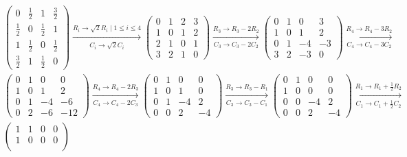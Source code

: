 \begin{align*}
	& \begin{pmatrix}
		0 & \frac{1}{2} & 1 & \frac{3}{2} \\
		\frac{1}{2} & 0 & \frac{1}{2} & 1 \\
		1 & \frac{1}{2} & 0 & \frac{1}{2} \\
		\frac{3}{2} & 1 & \frac{1}{2} & 0
	\end{pmatrix}
	\xrightarrow[C_i \to \sqrt{2} C_i]{R_i \to \sqrt{2} R_i \mid 1 \le i \le 4}
	\begin{pmatrix}
		0 & 1 & 2 & 3 \\
		1 & 0 & 1 & 2 \\
		2 & 1 & 0 & 1 \\
		3 & 2 & 1 & 0
	\end{pmatrix}
	\xrightarrow[C_3 \to C_3 - 2C_2]{R_3 \to R_3 - 2R_2}
	\begin{pmatrix}
		0 & 1 & 0 & 3 \\
		1 & 0 & 1 & 2 \\
		0 & 1 & -4 & -3 \\
		3 & 2 & -3 & 0
	\end{pmatrix}
	\xrightarrow[C_4 \to C_4 - 3C_2]{R_4 \to R_4 - 3R_2} \\
	& \begin{pmatrix}
		0 & 1 & 0 & 0 \\
		1 & 0 & 1 & 2 \\
		0 & 1 & -4 & -6 \\
		0 & 2 & -6 & -12
	\end{pmatrix}
	\xrightarrow[C_4 \to C_4 - 2C_3]{R_4 \to R_4 - 2R_3}
	\begin{pmatrix}
		0 & 1 & 0 & 0 \\
		1 & 0 & 1 & 0 \\
		0 & 1 & -4 & 2 \\
		0 & 0 & 2 & -4
	\end{pmatrix}
	\xrightarrow[C_3 \to C_3 - C_1]{R_3 \to R_3 - R_1}
	\begin{pmatrix}
		0 & 1 & 0 & 0 \\
		1 & 0 & 0 & 0 \\
		0 & 0 & -4 & 2 \\
		0 & 0 & 2 & -4
	\end{pmatrix}
	\xrightarrow[C_1 \to C_1 + \frac{1}{2}C_2]{R_1 \to R_1 + \frac{1}{2}R_2} \\
	& \begin{pmatrix}
		1 & 1 & 0 & 0 \\
		1 & 0 & 0 & 0 \\

\end{pmatrix}
\end{align*}
